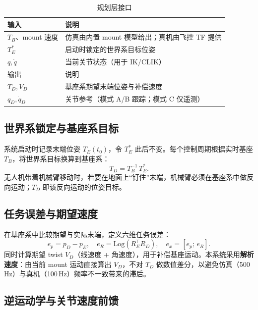 \documentclass[UTF8, a4paper, 12pt]{ctexart}
\newcommand{\Log}{\mathrm{Log}}
\begin{document}
\begin{table}[H]
  \centering
  \caption{规划层接口}
  \renewcommand{\arraystretch}{1.2}
  \begin{tabularx}{\textwidth}{@{} l X @{}}
    \toprule
    输入 & 说明 \\
    \midrule
    $T_B$、mount 速度 & 仿真由内置 mount 模型给出；真机由飞控 TF 提供 \\
    $T_E^*$ & 启动时锁定的世界系目标位姿 \\
    $q,\dot{q}$ & 当前关节状态（用于 IK/CLIK） \\
    \midrule
    输出 & 说明 \\
    $T_D,V_D$ & 基座系期望末端位姿与补偿速度 \\
    $q_D,\dot{q}_D$ & 关节参考（模式 A/B 跟踪；模式 C 仅遥测） \\
    \bottomrule
  \end{tabularx}
\end{table}

\subsection{世界系锁定与基座系目标}

系统启动时记录末端位姿 $T_E(t_0)$，令 $T_E^*$ 此后不变。每个控制周期根据实时基座 $T_B$，将世界系目标换算到基座系：
\begin{equation}
    T_D = T_B^{-1}\, T_E^*.
\end{equation}
无人机带着机械臂移动时，若要在地面上``钉住''末端，机械臂必须在基座系中做反向运动；$T_D$ 即该反向运动的位姿目标。

\subsection{任务误差与期望速度}

在基座系中比较期望与实际末端，定义六维任务误差：
\begin{equation}
    e_p = p_D - p_E, \quad
    e_R = \Log(R_E^\top R_D), \quad
    e_x = [e_p;\, e_R].
\end{equation}
同时计算期望 twist $V_D$（线速度 + 角速度），用于补偿基座运动。本系统采用\textbf{解析速度}：由当前 mount 运动直接算出 $V_D$，不对 $T_D$ 做数值差分，以避免仿真（500\,Hz）与真机（100\,Hz）频率不一致带来的滞后。

\subsection{逆运动学与关节速度前馈}
\end{document}
